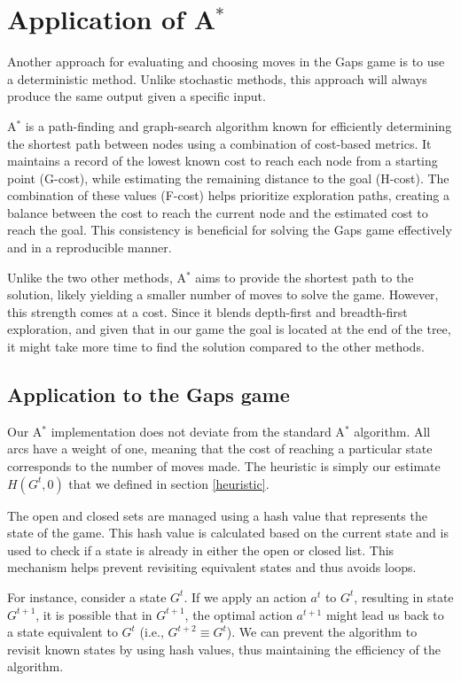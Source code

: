 \chapter{Application of A$^*$}
Another approach for evaluating and choosing moves in the Gaps game is to use a deterministic method. Unlike stochastic methods, this approach will always produce the same output given a specific input.

A$^*$ is a path-finding and graph-search algorithm known for efficiently determining the shortest path between nodes using a combination of cost-based metrics. It maintains a record of the lowest known cost to reach each node from a starting point (G-cost), while estimating the remaining distance to the goal (H-cost). The combination of these values (F-cost) helps prioritize exploration paths, creating a balance between the cost to reach the current node and the estimated cost to reach the goal. This consistency is beneficial for solving the Gaps game effectively and in a reproducible manner.

Unlike the two other methods, A$^*$ aims to provide the shortest path to the solution, likely yielding a smaller number of moves to solve the game. However, this strength comes at a cost. Since it blends depth-first and breadth-first exploration, and given that in our game the goal is located at the end of the tree, it might take more time to find the solution compared to the other methods.

\section{Application to the Gaps game}
Our A$^*$ implementation does not deviate from the standard A$^*$ algorithm. All arcs have a weight of one, meaning that the cost of reaching a particular state corresponds to the number of moves made. The heuristic is simply our estimate $H(G^t, 0)$ that we defined in section \ref{heuristic}.

The open and closed sets are managed using a hash value that represents the state of the game. This hash value is calculated based on the current state and is used to check if a state is already in either the open or closed list. This mechanism helps prevent revisiting equivalent states and thus avoids loops.

For instance, consider a state $G^t$. If we apply an action $ a^t$ to $G^t$, resulting in state $G^{t+1}$, it is possible that in $G^{t+1}$, the optimal action $a^{t+1}$ might lead us back to a state equivalent to $G^t$ (i.e., $G^{t+2} \equiv G^t$). We can prevent the algorithm to revisit known states by using hash values, thus maintaining the efficiency of the algorithm.

